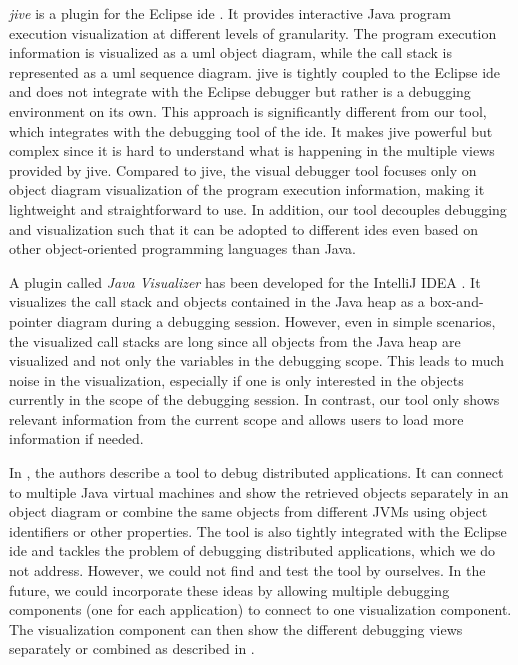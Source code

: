 \documentclass[conference]{IEEEtran}
\newcommand{\intellij}{IntelliJ IDEA}
\begin{document}
\textit{\gls*{jive}} is a plugin for the Eclipse \gls*{ide} \cite{czyzDeclarativeVisualDebugging2007,k.p.FiniteStateModel2021, JIVEJavaInteractive}.
It provides interactive Java program execution visualization at different levels of granularity.
The program execution information is visualized as a \gls*{uml} object diagram, while the call stack is represented as a \gls*{uml} sequence diagram.
\gls*{jive} is tightly coupled to the Eclipse \gls*{ide} and does not integrate with the Eclipse debugger but rather is a debugging environment on its own.
This approach is significantly different from our tool, which integrates with the debugging tool of the \gls*{ide}.
It makes \gls*{jive} powerful but complex since it is hard to understand what is happening in the multiple views provided by \gls*{jive}.
Compared to \gls*{jive}, the visual debugger tool focuses only on object diagram visualization of the program execution information, making it lightweight and straightforward to use.
In addition, our tool decouples debugging and visualization such that it can be adopted to different \glspl*{ide} even based on other object-oriented programming languages than Java.

A plugin called \textit{Java Visualizer} has been developed for the \intellij{} \cite{JavaVisualizerIntelliJ}.
It visualizes the call stack and objects contained in the Java heap as a box-and-pointer diagram during a debugging session.
However, even in simple scenarios, the visualized call stacks are long since all objects from the Java heap are visualized and not only the variables in the debugging scope.
This leads to much noise in the visualization, especially if one is only interested in the objects currently in the scope of the debugging session.
In contrast, our tool only shows relevant information from the current scope and allows users to load more information if needed.

In \cite{kochGraphicalDebuggingDistributed2015}, the authors describe a tool to debug distributed applications.
It can connect to multiple Java virtual machines and show the retrieved objects separately in an object diagram or combine the same objects from different JVMs using object identifiers or other properties.
The tool is also tightly integrated with the Eclipse \gls*{ide} and tackles the problem of debugging distributed applications, which we do not address.
However, we could not find and test the tool by ourselves.
In the future, we could incorporate these ideas by allowing multiple debugging components (one for each application) to connect to one visualization component.
The visualization component can then show the different debugging views separately or combined as described in \cite{kochGraphicalDebuggingDistributed2015}.
\end{document}
